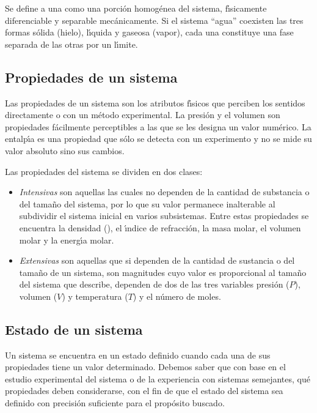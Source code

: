 Se define a una  como una porci\'on homog\'enea del sistema, f\'{\i}sica\-mente diferenciable y separable mec\'anicamente. Si el sistema ``agua'' coexisten las tres formas s\'olida (hielo), l\'{\i}quida y gaseosa (vapor), cada una constituye una fase separada de las otras por un l\'{\i}mite.


\subsection{Propiedades de un sistema}
Las propiedades de un sistema son los atributos f\'{\i}sicos que perciben los sentidos directamente o con un m\'etodo experimental. La presi\'on y el vo\-lumen son propiedades f\'acilmente perceptibles a las que se les designa un valor num\'erico. La entalp\'{\i}a es una propiedad que s\'olo se detecta con un experimento y no se mide su valor absoluto sino sus cambios.

Las propiedades del sistema se dividen en dos clases:

\begin{itemize}
\item \textit{Intensivas}  son aquellas las cuales no dependen de la cantidad de substancia o del tama\~no del  sistema, por lo que su valor permanece inalterable al subdividir el sistema inicial en varios subsistemas. Entre estas propiedades se encuentra la densidad (), el \'{\i}ndice de refracci\'on, la masa molar, el volumen molar y la e\-nerg\'{\i}a molar. 
\item \textit{Extensivas} son aquellas que si dependen de la cantidad de sustancia o del tama\~no de un sistema, son magnitudes cuyo valor es proporcional al tama\~no del sistema que describe, dependen de dos de las tres variables presi\'on ($P$), volumen ($V$) y temperatura ($T$) y el n\'umero de moles.
\end{itemize}

\subsection{Estado de un sistema}
Un sistema se encuentra en un estado definido cuando cada una de sus propiedades tiene un valor determinado. Debemos saber que con base en el estudio experimental del sistema o de la experiencia con sistemas semejantes, qu\'e propiedades deben considerarse, con el fin de que el estado del sistema sea definido con precisi\'on suficiente para el prop\'osito buscado.

